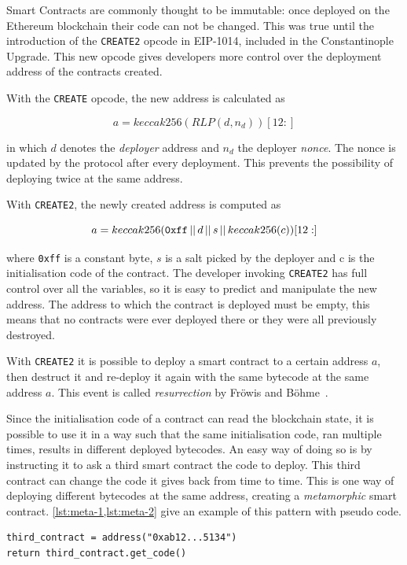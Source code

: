 Smart Contracts are commonly thought to be immutable: once deployed on the Ethereum blockchain their code can not be changed. This was true until the introduction of the {\tt CREATE2} opcode in EIP-1014, included in the Constantinople Upgrade. This new opcode gives developers more control over the deployment address of the contracts created. 

With the {\tt CREATE} opcode, the new address is calculated as

\[a=keccak256(RLP(d,n_d))[12:] \]

in which $d$ denotes the \textit{deployer} address and $n_d$ the deployer \textit{nonce}. The nonce is updated by the protocol after every deployment. This prevents the possibility of deploying twice at the same address.

With {\tt CREATE2}, the newly created address is computed as

\[a=keccak256({\tt 0xff}\,||\,d\,||\,s\,||\,keccak256(c))[12:]\]

where {\tt 0xff} is a constant byte, $s$ is a salt picked by the deployer and c is the initialisation code of the contract. The developer invoking {\tt CREATE2} has full control over all the variables, so it is easy to predict and manipulate the new address. The address to which the contract is deployed must be empty, this means that no contracts were ever deployed there or they were all previously destroyed.

With {\tt CREATE2} it is possible to deploy a smart contract to a certain address $a$, then destruct it and re-deploy it again with the same bytecode at the same address $a$. This event is called \textit{resurrection} by Fröwis and Böhme~\cite{create2-metamorphic}. 

Since the initialisation code of a contract can read the blockchain state, it is possible to use it in a way such that the same initialisation code, ran multiple times, results in different deployed bytecodes. An easy way of doing so is by instructing it to ask a third smart contract the code to deploy. This third contract can change the code it gives back from time to time. This is one way of deploying different bytecodes at the same address, creating a \textit{metamorphic} smart contract. \cref{lst:meta-1,lst:meta-2} give an example of this pattern with pseudo code.

\begin{lstlisting}[label={lst:meta-1},caption={Pseudo initialization code that gets the code to deploy from another contract.}]
third_contract = address("0xab12...5134")
return third_contract.get_code()
\end{lstlisting}


